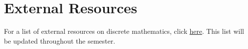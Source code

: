 \documentclass[letterpaper]{inzane_syllabus} %
\begin{document}
\vspace{1cm}
\section{External Resources}

For a list of external resources on discrete mathematics, click  \href{https://github.com/mikewojnowicz/csci246_spring2025/blob/main/LINKS.md}{here}.  This list will be updated throughout the semester.

\vspace{0.5cm}


\end{document}
